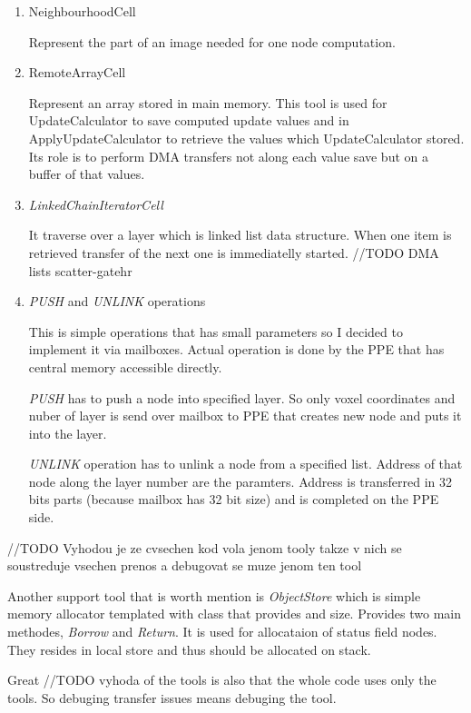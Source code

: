 \begin{enumerate}
\item NeighbourhoodCell
\par
Represent the part of an image needed for one node computation.

\item RemoteArrayCell
\par
Represent an array stored in main memory. This tool is used for
UpdateCalculator to save computed update values and in ApplyUpdateCalculator to
retrieve the values which UpdateCalculator stored. Its role is to perform DMA
transfers not along each value save but on a buffer of that values.

\item \emph{LinkedChainIteratorCell}
\par
It traverse over a layer which is linked list data structure. When one item is
retrieved transfer of the next one is immediatelly started.
//TODO DMA lists scatter-gatehr

\item \emph{PUSH} and \emph{UNLINK} operations
\par
This is simple operations that has small parameters so I decided to implement
it via mailboxes. Actual operation is done by the PPE that has
central memory accessible directly.
\par
\emph{PUSH} has to push a node into
specified layer. So only voxel coordinates and nuber of layer is send over
mailbox to PPE that creates new node and puts it into the layer.

\par
\emph{UNLINK} operation has to unlink a node from a specified list. Address of
that node along the layer number are the paramters. Address is transferred in
32 bits parts (because mailbox has 32 bit size) and is completed on the PPE
side.
\end{enumerate}

//TODO
Vyhodou je ze cvsechen kod vola jenom tooly takze v nich se soustreduje vsechen
prenos a debugovat se muze jenom ten tool

Another support tool that is worth mention is \emph{ObjectStore} which is
simple memory allocator templated with class that provides and size. Provides
two main methodes, \emph{Borrow} and \emph{Return}. It is used for allocataion
of status field nodes. They resides in local store and thus should be allocated
on stack.

Great //TODO vyhoda of the tools is also that the whole code uses only the
tools. So debuging transfer issues means debuging the tool.

